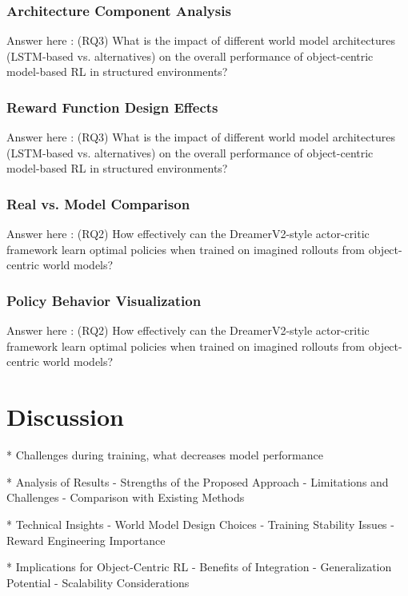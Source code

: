 \documentclass[
	english,
	ruledheaders=section,
	class=report,
	thesis={type=master},
	accentcolor=9c,
	custommargins=true,
	marginpar=false,
	parskip=half-,
	fontsize=11pt,
]{tudapub}
\begin{document}
\subsection{Architecture Component Analysis}
\label{subsec:architecture_analysis}
Answer here : (RQ3) What is the impact of different world model architectures (LSTM-based vs. alternatives) on the overall performance of object-centric model-based RL in structured environments?


\subsection{Reward Function Design Effects}
\label{subsec:reward_effects}
Answer here : (RQ3) What is the impact of different world model architectures (LSTM-based vs. alternatives) on the overall performance of object-centric model-based RL in structured environments?


\subsection{Real vs. Model Comparison}
\label{subsec:real_vs_model}
Answer here : (RQ2) How effectively can the DreamerV2-style actor-critic framework learn optimal policies when trained on imagined rollouts from object-centric world models?


\subsection{Policy Behavior Visualization}
\label{subsec:policy_visualization}
Answer here : (RQ2) How effectively can the DreamerV2-style actor-critic framework learn optimal policies when trained on imagined rollouts from object-centric world models?

\chapter{Discussion}
\label{chap:discussion}
* Challenges during training, what decreases model performance

* Analysis of Results
	- Strengths of the Proposed Approach
	- Limitations and Challenges
	- Comparison with Existing Methods

* Technical Insights
	- World Model Design Choices
	- Training Stability Issues
	- Reward Engineering Importance

* Implications for Object-Centric RL
	- Benefits of Integration
	- Generalization Potential
	- Scalability Considerations
\end{document}
